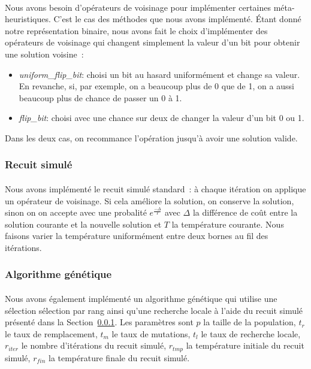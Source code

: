 \documentclass[12pt,letterpaper,twoside]{article}
\begin{document}
				\paragraph*{}
					Nous avons besoin d'opérateurs de voisinage pour implémenter certaines méta-heuristiques.
					C'est le cas des méthodes que nous avons implémenté.
					Étant donné notre représentation binaire, nous avons fait le choix d'implémenter des
					opérateurs de voisinage qui changent simplement la valeur d'un bit pour obtenir une solution voisine~:
					\begin{itemize}
						\item \emph{uniform\_flip\_bit}: choisi un bit au hasard uniformément et change sa valeur.
							En revanche, si, par exemple, on a beaucoup plus de 0 que de 1, on a aussi beaucoup plus de chance de
							passer un 0 à 1.
						\item \emph{flip\_bit}: choisi avec une chance sur deux de changer la valeur d'un bit 0 ou 1.
					\end{itemize}
					Dans les deux cas, on recommance l'opération jusqu'à avoir une solution valide.

			\subsubsection{Recuit simulé}\label{sec:sim-annealing}
				\paragraph*{}
					Nous avons implémenté le recuit simulé standard~: à chaque itération on applique un opérateur de voisinage.
					Si cela améliore la solution, on conserve la solution, sinon on on accepte avec une probalité \(e^{\frac{-\Delta}{T}}\) avec \(\Delta\) la différence de coût
					entre la solution courante et la nouvelle solution et \(T\) la température courante.
					Nous faisons varier la température uniformément entre deux bornes au fil des itérations.

			\subsubsection{Algorithme génétique}
				\paragraph*{}
					Nous avons également implémenté un algorithme génétique qui utilise une sélection sélection par rang ainsi qu'une recherche locale
					à l'aide du recuit simulé présenté dans la Section~\ref{sec:sim-annealing}.
					Les paramètres sont \(p\) la taille de la population, \(t_r\) le taux de remplacement, \(t_m\) le taux de mutations,
					\(t_l\) le taux de recherche locale, \(r_{iter}\) le nombre d'itérations du recuit simulé, \(r_{tmp}\) la température initiale du recuit simulé,
					\(r_{fin}\) la température finale du recuit simulé.
\end{document}
